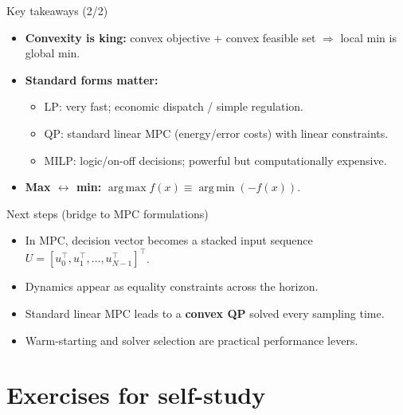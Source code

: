 \documentclass[aspectratio=169,10pt]{beamer}
\newcommand{\argmin}{\operatorname*{arg\,min}}
\newcommand{\argmax}{\operatorname*{arg\,max}}
\begin{document}
\begin{frame}{Key takeaways (2/2)}
\begin{itemize}
  \item \textbf{Convexity is king:} convex objective + convex feasible set $\Rightarrow$ local min is global min.
  \item \textbf{Standard forms matter:}
  \begin{itemize}
    \item LP: very fast; economic dispatch / simple regulation.
    \item QP: standard linear MPC (energy/error costs) with linear constraints.
    \item MILP: logic/on-off decisions; powerful but computationally expensive.
  \end{itemize}
  \item \textbf{Max $\leftrightarrow$ min:} $\argmax f(x)\equiv \argmin (-f(x))$.
\end{itemize}
\end{frame}

\begin{frame}{Next steps (bridge to MPC formulations)}
\begin{itemize}
  \item In MPC, decision vector becomes a stacked input sequence $U = [u_0^\top,u_1^\top,\dots,u_{N-1}^\top]^\top$.
  \item Dynamics appear as equality constraints across the horizon.
  \item Standard linear MPC leads to a \textbf{convex QP} solved every sampling time.
  \item Warm-starting and solver selection are practical performance levers.
\end{itemize}
\end{frame}

\section{Exercises for self-study}
\end{document}
